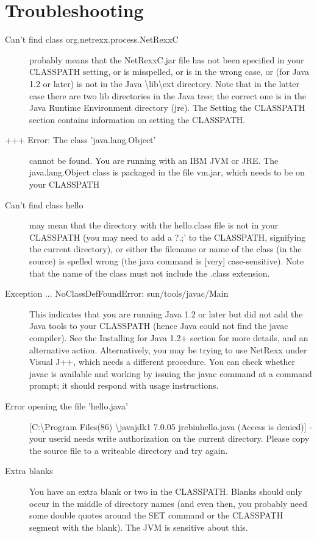 \chapter{Troubleshooting\label{troubleshooting}}
\begin{description} 
\item[Can't find class org.netrexx.process.NetRexxC]
  probably means that the NetRexxC.jar file has not been specified in
  your CLASSPATH setting, or is misspelled, or is in the wrong case,
  or (for Java 1.2 or later) is not in the Java
  \textbackslash lib\textbackslash ext directory. Note that in the latter case there are two lib directories in the Java tree; the correct one is in the Java Runtime Environment directory (jre).
The Setting the CLASSPATH section contains information on setting the CLASSPATH.
\item[+++ Error: The class 'java.lang.Object'] cannot be found. You are running with an IBM JVM or JRE. The java.lang.Object class is packaged in the file vm.jar, which needs to be on your CLASSPATH
\item[Can't find class hello] may mean that the directory with the hello.class file is not in your CLASSPATH (you may need to add a ?.;’ to the CLASSPATH, signifying the current directory), or either the filename or name of the class (in the source) is spelled wrong (the java command is [very] case-sensitive). Note that the name of the class must not include the .class extension.
\item[Exception ... NoClassDefFoundError: sun/tools/javac/Main] This indicates that you are running Java 1.2 or later but did not add the Java tools to your CLASSPATH (hence Java could not find the javac compiler). See the Installing for Java 1.2+ section for more details, and an alternative action.
Alternatively, you may be trying to use NetRexx under Visual J++, which needs a different procedure. You can check whether javac is available and working by issuing the javac command at a command prompt; it should respond with usage instructions.
\item[Error opening the file 'hello.java'][C:\textbackslash Program Files(86) \textbackslash javajdk1 7.0.05 jrebinhello.java (Access is denied)] - your userid needs write authorization on the current directory. Please copy the source file to a writeable directory and try again.
\item[Extra blanks] You have an extra blank or two in the CLASSPATH. Blanks should only occur in the middle of directory names (and even then, you probably need some double quotes around the SET command or the CLASSPATH segment with the blank). The JVM is sensitive about this.

\end{description}

